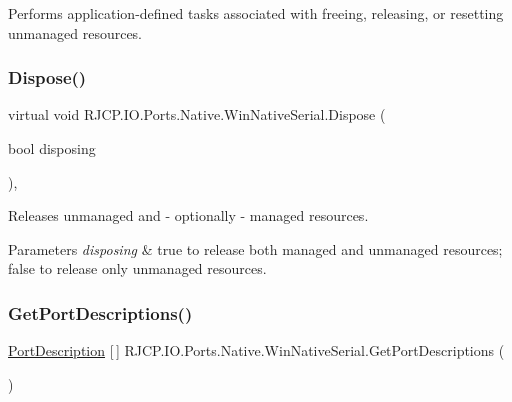 Performs application-\/defined tasks associated with freeing, releasing, or resetting unmanaged resources. 

\mbox{\label{class_r_j_c_p_1_1_i_o_1_1_ports_1_1_native_1_1_win_native_serial_aff7fb25de681a40096de254df90aae88}} 
\subsubsection{\texorpdfstring{Dispose()}{Dispose()}\hspace{0.1cm}{\footnotesize\ttfamily [2/2]}}
{\footnotesize\ttfamily virtual void R\+J\+C\+P.\+I\+O.\+Ports.\+Native.\+Win\+Native\+Serial.\+Dispose (\begin{DoxyParamCaption}\item[{bool}]{disposing }\end{DoxyParamCaption})\hspace{0.3cm}{\ttfamily [protected]}, {\ttfamily [virtual]}}



Releases unmanaged and -\/ optionally -\/ managed resources. 


\begin{DoxyParams}{Parameters}
{\em disposing} & {\ttfamily true} to release both managed and unmanaged resources; {\ttfamily false} to release only unmanaged resources.\\
\hline
\end{DoxyParams}
\mbox{\label{class_r_j_c_p_1_1_i_o_1_1_ports_1_1_native_1_1_win_native_serial_a8e8c6fdc7f6249e5c6a23fd1d4170b29}} 
\subsubsection{\texorpdfstring{GetPortDescriptions()}{GetPortDescriptions()}}
{\footnotesize\ttfamily \mbox{\hyperlink{class_r_j_c_p_1_1_i_o_1_1_ports_1_1_port_description}{Port\+Description}} \mbox{[}$\,$\mbox{]} R\+J\+C\+P.\+I\+O.\+Ports.\+Native.\+Win\+Native\+Serial.\+Get\+Port\+Descriptions (\begin{DoxyParamCaption}{ }\end{DoxyParamCaption})}



